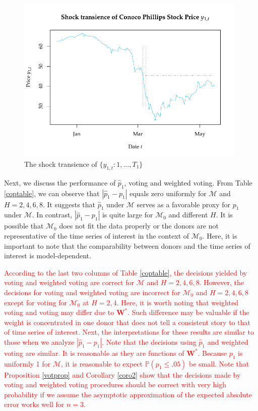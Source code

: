 \documentclass[11pt]{article}
\def\mbf#1{\mathbf{#1}} %
\def\mc#1{\mathcal{#1}} %
\def\mc#1{\mathcal{#1}}
\def\P{\mathbb{P}}
\theoremstyle{definition}
\begin{document}
\begin{figure}[H]
	\begin{center}
		\includegraphics[height = 8cm]{COPtransience.pdf}
		\caption{The shock transience of $\{y_{1,t} \colon 1, \ldots, T_1\}$} \label{copshocktransience}
	\end{center}	
\end{figure}

Next, we discuss the performance of $\hat{p}_1$, voting and weighted voting. From Table \ref{coptable},  we can observe that $|\hat{p}_1-p_1|$ equals zero uniformly for $\mc{M}$ and $H = 2, 4, 6, 8$. It suggests that $\hat{p}_1$ under $\mc{M}$ serves as a favorable proxy for $p_1$ under $\mc{M}$. In contrast, $|\hat{p}_1-p_1|$ is quite large for $\mc{M}_0$ and different $H$. It is possible that $\mc{M}_0$  does not fit the data properly or the donors are not representative of the time series of interest in the context of $\mc{M}_0$. Here, it is important to note that  the comparability between donors and the time series of interest is model-dependent. 

\textcolor{red}{According to the last two columns of Table \ref{coptable}, the decisions yielded by voting and weighted voting are correct for $\mc{M}$ and $H = 2, 4, 6, 8$. However, the decisions for voting and weighted voting are incorrect for $\mc{M}_0$ and $H=2, 4, 6, 8$ except for voting for $\mc{M}_0$ at $H = 2,4$. Here, it is worth noting that weighted voting and voting may differ due to $\mbf{W}^*$. Such difference may be valuable if the weight is concentrated in one donor that does not tell a consistent story to that of time series of interest. Next, the interpretations for these results are similar to those when we analyze $|\hat{p}_1-p_1|$. Note that the decisions using $\hat{p}_1$ and weighted voting are similar. It is reasonable as they are functions of $\mbf{W}^*$. Because $p_1$ is uniformly 1 for $\mc{M}$, it is reasonable to expect $\P(p_1\leq .05)$ be small. Note that Proposition \ref{votprop} and Corollary \ref{coro2} show that the decisions made by voting and weighted voting procedures should be correct with very high probability if we assume the asymptotic approximation of the expected absolute error works well for  $n = 3$.}
\end{document}
